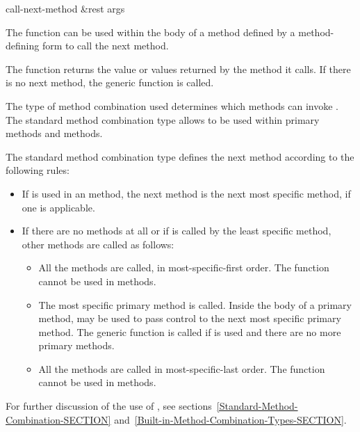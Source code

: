 \begin{defun}[Function]
call-next-method &rest args

The function  can be used within the body of a
method defined by a method-defining form to call the next method.

The function  returns the value or values
returned by the method it calls.  If there is no next method, 
the generic function  is called.

The type of method combination used determines which 
methods can invoke .  The standard method
combination type allows 
to be used within primary
methods and  methods.

The standard method combination
type defines the next method according to the following rules:

\begin{itemize}
\item 
If  is used in an  method,
the next method is the next most specific  method, if one is
applicable.

\item 
If there are no  methods at all or if 
 is called by the least specific 
method,  other methods are called as follows:

\begin{itemize}
\item  All the  methods are called, in
most-specific-first order.  The function 
cannot be used in  methods.

\item 
The most specific primary method is called.  Inside the body of a
primary method,  may be used to pass control to
the next most specific primary method.  The generic function 
 is called if  is used and there
are no more primary methods.

\item  All the  methods are called in
most-specific-last order.  The function 
cannot be used in  methods.
\end{itemize}
\end{itemize}

For further discussion of the use of , see
sections~\ref{Standard-Method-Combination-SECTION}
and~\ref{Built-in-Method-Combination-Types-SECTION}.





\end{defun}
